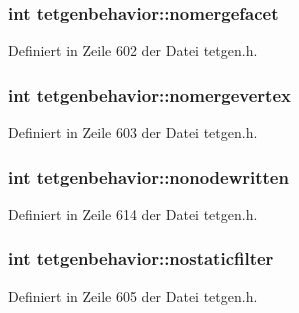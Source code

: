 \hypertarget{classtetgenbehavior_ae9694a67868753691892d5224fa51a19}{
\subsubsection[{nomergefacet}]{\setlength{\rightskip}{0pt plus 5cm}int tetgenbehavior\-::nomergefacet}}\label{classtetgenbehavior_ae9694a67868753691892d5224fa51a19}


Definiert in Zeile 602 der Datei tetgen.\-h.

\hypertarget{classtetgenbehavior_ae850103602ec01e41bf9f8906d142836}{
\subsubsection[{nomergevertex}]{\setlength{\rightskip}{0pt plus 5cm}int tetgenbehavior\-::nomergevertex}}\label{classtetgenbehavior_ae850103602ec01e41bf9f8906d142836}


Definiert in Zeile 603 der Datei tetgen.\-h.

\hypertarget{classtetgenbehavior_ad230dc09e59acf8147af213666aa88ba}{
\subsubsection[{nonodewritten}]{\setlength{\rightskip}{0pt plus 5cm}int tetgenbehavior\-::nonodewritten}}\label{classtetgenbehavior_ad230dc09e59acf8147af213666aa88ba}


Definiert in Zeile 614 der Datei tetgen.\-h.

\hypertarget{classtetgenbehavior_a9c83f3f72f2e0029d31b2977f2d75ecf}{
\subsubsection[{nostaticfilter}]{\setlength{\rightskip}{0pt plus 5cm}int tetgenbehavior\-::nostaticfilter}}\label{classtetgenbehavior_a9c83f3f72f2e0029d31b2977f2d75ecf}


Definiert in Zeile 605 der Datei tetgen.\-h.


